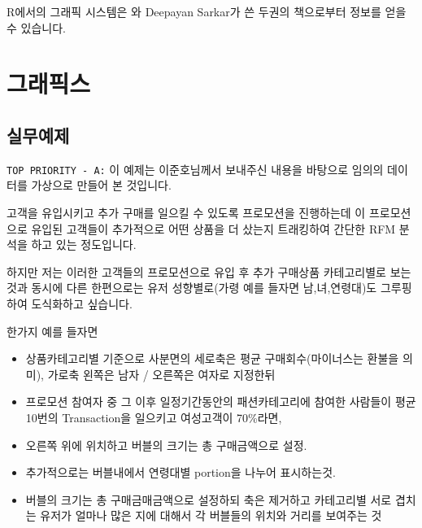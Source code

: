 %
%
%
%
%

R에서의 그래픽 시스템은 \citet{Murrell2005}와 Deepayan Sarkar가 쓴 두권의 책으로부터 정보를 얻을 수 있습니다.


\chapter{그래픽스}


\section{실무예제}

\texttt{TOP PRIORITY - A:} 
이 예제는 이준호님께서 보내주신 내용을 바탕으로 임의의 데이터를 가상으로 만들어 본 것입니다. 

고객을 유입시키고 추가 구매를 일으킬 수 있도록 프로모션을 진행하는데 이 프로모션으로 유입된 고객들이 추가적으로 어떤 상품을 더 샀는지 트래킹하여 간단한 RFM 분석을 하고 있는 정도입니다.

하지만 저는 이러한 고객들의 프로모션으로 유입 후 추가 구매상품 카테고리별로 보는것과 동시에 다른 한편으로는 유저 성향별로(가령 예를 들자면 남,녀,연령대)도 그루핑하여 도식화하고 싶습니다.

한가지 예를 들자면
\begin{itemize}
	\item 상품카테고리별 기준으로 사분면의 세로축은 평균 구매회수(마이너스는 환불을 의미), 가로축 왼쪽은 남자 / 오른쪽은 여자로 지정한뒤
	\item 프로모션 참여자 중 그 이후 일정기간동안의 패션카테고리에 참여한 사람들이 평균 10번의 Transaction을 일으키고 여성고객이 70\%라면,{}
	\item 오른쪽 위에 위치하고 버블의 크기는 총 구매금액으로 설정.
	\item 추가적으로는 버블내에서 연령대별 portion을 나누어 표시하는것.
	\item 버블의 크기는 총 구매금매금액으로 설정하되 축은 제거하고 카테고리별 서로 겹치는 유저가 얼마나 많은 지에 대해서 각 버블들의
위치와 거리를 보여주는 것
\end{itemize} 

